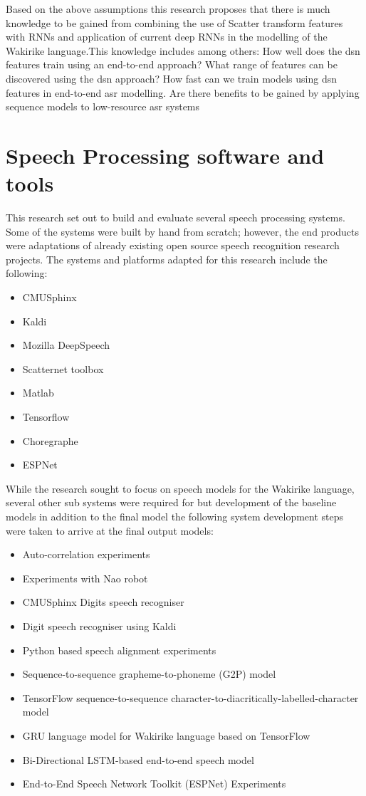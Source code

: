 Based on the above assumptions this research proposes that there is much knowledge to be gained from combining the use of Scatter transform features with RNNs and application of current deep RNNs in the modelling of the Wakirike language.\startblue This knowledge includes among others:
How well does the \acrshort{dsn} features train using an end-to-end approach?
What range of features can be discovered using the \acrshort{dsn} approach?
How fast can we train models using \acrshort{dsn} features in end-to-end \acrshort{asr} modelling.
Are there benefits to be gained by applying sequence models to low-resource \acrshort{asr} systems
\stopblue

\section{Speech Processing software and tools}
This research set out to build and evaluate several speech processing systems.  Some of the systems were built by hand from scratch; however, the end products were adaptations of already existing open source speech recognition research projects.  The systems and platforms adapted for this research include the following:
\begin{itemize}
    \item CMUSphinx
    \item Kaldi
    \item Mozilla DeepSpeech
    \item Scatternet toolbox
    \item Matlab
    \item Tensorflow
    \item Choregraphe
    \item ESPNet
\end{itemize}

While the research sought to focus on speech models for the Wakirike language, several other sub systems were required for but development of the baseline models in addition to the final model the following system development steps were taken to arrive at the final output models:
\begin{itemize}
    \item Auto-correlation experiments
    \item Experiments with Nao robot
    \item CMUSphinx Digits speech recogniser
    \item Digit speech recogniser using Kaldi
    \item Python based speech alignment experiments
    \item Sequence-to-sequence grapheme-to-phoneme (G2P) model
    \item TensorFlow sequence-to-sequence character-to-diacritically-labelled-character model
    \item GRU language model for Wakirike language based on TensorFlow
    \item Bi-Directional LSTM-based end-to-end speech model
    \item End-to-End Speech Network Toolkit (ESPNet) Experiments

\end{itemize}

